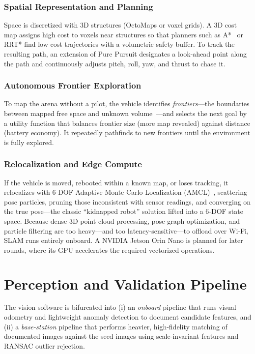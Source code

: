 \documentclass[journal]{IEEEtran}
\begin{document}
\subsubsection{Spatial Representation and Planning}
Space is discretized with 3D structures (OctoMaps or voxel grids). A 3D cost
map assigns high cost to voxels near structures so that planners such as
A*~\cite{hart1968astar} or RRT* find low-cost trajectories with a volumetric
safety buffer. To track the resulting path, an extension of Pure Pursuit
designates a look-ahead point along the path and continuously adjusts pitch,
roll, yaw, and thrust to chase it.

\subsubsection{Autonomous Frontier Exploration}
To map the arena without a pilot, the vehicle identifies
\emph{frontiers}---the boundaries between mapped free space and unknown
volume~\cite{yamauchi1997frontier}---and selects the next goal by a utility
function that balances frontier size (more map revealed) against distance
(battery economy). It repeatedly pathfinds to new frontiers until the
environment is fully explored.

\subsubsection{Relocalization and Edge Compute}
If the vehicle is moved, rebooted within a known map, or loses tracking, it
relocalizes with 6-DOF Adaptive Monte Carlo Localization
(AMCL)~\cite{fox2001amcl}, scattering pose particles, pruning those
inconsistent with sensor readings, and converging on the true pose---the
classic ``kidnapped robot'' solution lifted into a 6-DOF state space. Because
dense 3D point-cloud processing, pose-graph optimization, and particle
filtering are too heavy---and too latency-sensitive---to offload over Wi-Fi,
SLAM runs entirely onboard. A NVIDIA Jetson Orin Nano is planned for later
rounds, where its GPU accelerates the required vectorized operations.

\section{Perception and Validation Pipeline}
\label{sec:ml}
The vision software is bifurcated into (i) an \emph{onboard} pipeline that
runs visual odometry and lightweight anomaly detection to document candidate
features, and (ii) a \emph{base-station} pipeline that performs heavier,
high-fidelity matching of documented images against the seed images using
scale-invariant features and RANSAC outlier rejection.
\end{document}
